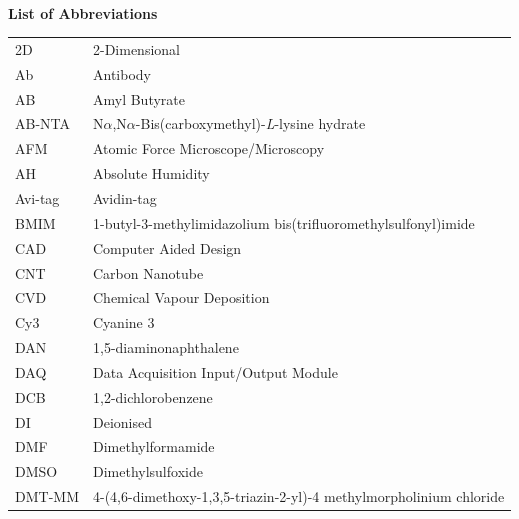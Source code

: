 \documentclass[
  a4paper,
]{scrbook}
\begin{document}
\clearpage
\newpage
\thispagestyle{empty} %
\mbox{~}
\clearpage
\newpage


\thispagestyle{plain}

\begin{flushleft}
\huge\textbf{List of Abbreviations}
\end{flushleft}

\vspace*{\baselineskip}

\begin{table}[H]
  \begin{tabular}{@{}p{} p{}@{}}  %
    2D  & 2-Dimensional  \\[5pt]
    Ab  & Antibody  \\[5pt]
    AB  & Amyl Butyrate  \\[5pt]
    AB-NTA  & N$\alpha$,N$\alpha$-Bis(carboxymethyl)-\textit{L}-lysine hydrate  \\[5pt]
    AFM  & Atomic Force Microscope/Microscopy  \\[5pt]
    AH  & Absolute Humidity  \\[5pt]
    Avi-tag  & Avidin-tag  \\[5pt]
    BMIM  & 1-butyl-3-methylimidazolium bis(trifluoromethylsulfonyl)imide  \\[5pt]
    CAD  & Computer Aided Design \\[5pt]
    CNT  & Carbon Nanotube  \\[5pt]
    CVD  & Chemical Vapour Deposition  \\[5pt]
    Cy3  & Cyanine 3  \\[5pt]
    DAN  & 1,5-diaminonaphthalene  \\[5pt]
    DAQ  & Data Acquisition Input/Output Module  \\[5pt]
    DCB  & 1,2-dichlorobenzene  \\[5pt]
    DI  & Deionised  \\[5pt]
    DMF  & Dimethylformamide   \\[5pt]
    DMSO  & Dimethylsulfoxide   \\[5pt]
    DMT-MM   & 4-(4,6-dimethoxy-1,3,5-triazin-2-yl)-4 methylmorpholinium chloride \\[5pt]

\end{tabular}
\end{table}
\end{document}
